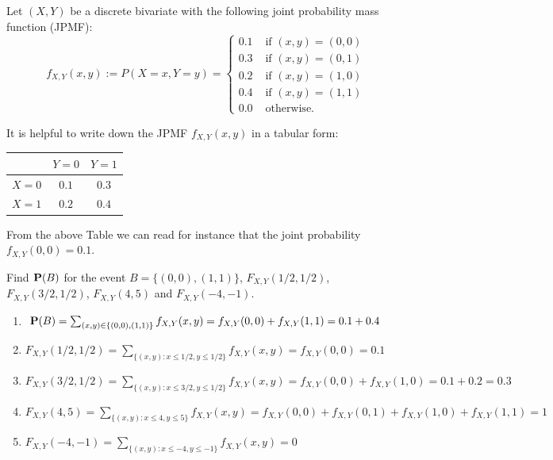 \begin{example}\label{Eg:Discrete2DPMF}
Let $(X,Y)$ be a discrete bivariate \rv with the following joint probability mass function (JPMF):
\[
f_{X,Y}(x,y) := P (X=x,Y=y)  = 
\begin{cases}
0.1 & \text{ if } (x,y)=(0,0)\\
0.3 & \text{ if } (x,y)=(0,1)\\
0.2 & \text{ if } (x,y)=(1,0)\\
0.4 & \text{ if } (x,y)=(1,1)\\
0.0 & \text{ otherwise.}
\end{cases} 
\]
\begin{center}
\end{center}
It is helpful to write down the JPMF $f_{X,Y}(x,y)$ in a tabular form:
\begin{center}
\begin{tabular}{|c|c c|}
\hline
& $Y=0$ & $Y=1$ \\ \hline
$X=0$& $0.1$ & $0.3$  \\
$X=1$& $0.2$ & $0.4$  \\ \hline
\end{tabular}
\end{center}
From the above Table we can read for instance that the joint probability $f_{X,Y}(0,0)=0.1$.

Find $\mathbf{P}(B)$ for the event $B=\{(0,0),(1,1)\}$, $F_{X,Y}(1/2,1/2)$, $F_{X,Y}(3/2,1/2)$, $F_{X,Y}(4,5)$ and $F_{X,Y}(-4,-1)$.

\begin{enumerate}
\item $\mathbf{P}(B) = \sum_{(x,y) \in \{(0,0),(1,1)\}}f_{X,Y}(x,y) = f_{X,Y}(0,0)+f_{X,Y}(1,1)=0.1+0.4$
\item $F_{X,Y}(1/2,1/2) = \sum_{\{(x,y): x\leq 1/2, y \leq 1/2\}} f_{X,Y}(x,y)=f_{X,Y}(0,0)=0.1$
\item $F_{X,Y}(3/2,1/2) = \sum_{\{(x,y): x\leq 3/2, y \leq 1/2\}} f_{X,Y}(x,y)=f_{X,Y}(0,0)+f_{X,Y}(1,0)=0.1+0.2=0.3$
\item $F_{X,Y}(4,5) = \sum_{\{(x,y): x\leq 4, y \leq 5\}} f_{X,Y}(x,y)=f_{X,Y}(0,0)+f_{X,Y}(0,1)+f_{X,Y}(1,0)+f_{X,Y}(1,1)=1$
\item $F_{X,Y}(-4,-1) = \sum_{\{(x,y): x\leq -4, y \leq -1\}} f_{X,Y}(x,y)=0$
\end{enumerate}
\end{example}

